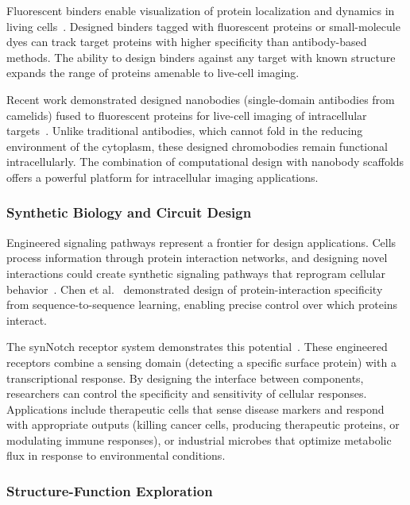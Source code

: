 Fluorescent binders enable visualization of protein localization and dynamics in living cells~\cite{ruffolo2022deepab}. Designed binders tagged with fluorescent proteins or small-molecule dyes can track target proteins with higher specificity than antibody-based methods. The ability to design binders against any target with known structure expands the range of proteins amenable to live-cell imaging.

Recent work demonstrated designed nanobodies (single-domain antibodies from camelids) fused to fluorescent proteins for live-cell imaging of intracellular targets~\cite{zhang2024nanobody}. Unlike traditional antibodies, which cannot fold in the reducing environment of the cytoplasm, these designed chromobodies remain functional intracellularly. The combination of computational design with nanobody scaffolds offers a powerful platform for intracellular imaging applications.

\subsubsection{Synthetic Biology and Circuit Design}

Engineered signaling pathways represent a frontier for design applications. Cells process information through protein interaction networks, and designing novel interactions could create synthetic signaling pathways that reprogram cellular behavior~\cite{bennett2024symmetric}. Chen et al.~\cite{chen2019design} demonstrated design of protein-interaction specificity from sequence-to-sequence learning, enabling precise control over which proteins interact.

The synNotch receptor system demonstrates this potential~\cite{morsut2016synnotch}. These engineered receptors combine a sensing domain (detecting a specific surface protein) with a transcriptional response. By designing the interface between components, researchers can control the specificity and sensitivity of cellular responses. Applications include therapeutic cells that sense disease markers and respond with appropriate outputs (killing cancer cells, producing therapeutic proteins, or modulating immune responses), or industrial microbes that optimize metabolic flux in response to environmental conditions.

\subsubsection{Structure-Function Exploration}

